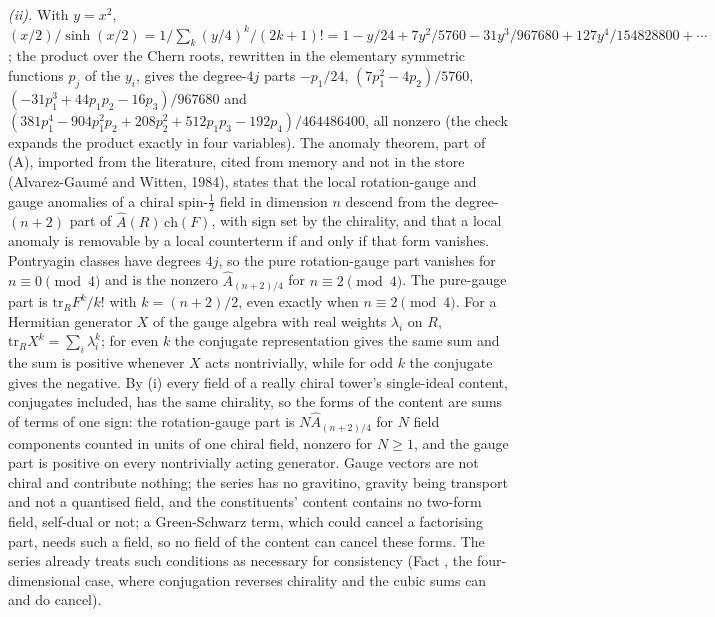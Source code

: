 \emph{(ii).} With $y = x^{2}$, $(x/2)/\sinh(x/2) = 1/\sum_{k} (y/4)^{k}/(2k+1)! = 1 - y/24 + 7y^{2}/5760 - 31y^{3}/967680 + 127y^{4}/154828800 + \cdots$; the product over the Chern roots, rewritten in the elementary symmetric functions $p_{j}$ of the $y_{i}$, gives the degree-$4j$ parts $-p_{1}/24$, $(7p_{1}^{2} - 4p_{2})/5760$, $(-31p_{1}^{3} + 44p_{1}p_{2} - 16p_{3})/967680$ and $(381p_{1}^{4} - 904p_{1}^{2}p_{2} + 208p_{2}^{2} + 512p_{1}p_{3} - 192p_{4})/464486400$, all nonzero (the check expands the product exactly in four variables). The anomaly theorem, part of (A), imported from the literature, cited from memory and not in the store (Alvarez-Gaum\'e and Witten, 1984), states that the local rotation-gauge and gauge anomalies of a chiral spin-$\tfrac12$ field in dimension $n$ descend from the degree-$(n+2)$ part of $\hat{A}(R)\,\mathrm{ch}(F)$, with sign set by the chirality, and that a local anomaly is removable by a local counterterm if and only if that form vanishes. Pontryagin classes have degrees $4j$, so the pure rotation-gauge part vanishes for $n \equiv 0 \pmod 4$ and is the nonzero $\hat{A}_{(n+2)/4}$ for $n \equiv 2 \pmod 4$. The pure-gauge part is $\mathrm{tr}_{R}F^{k}/k!$ with $k = (n+2)/2$, even exactly when $n \equiv 2 \pmod 4$. For a Hermitian generator $X$ of the gauge algebra with real weights $\lambda_{i}$ on $R$, $\mathrm{tr}_{R}X^{k} = \sum_{i}\lambda_{i}^{k}$; for even $k$ the conjugate representation gives the same sum and the sum is positive whenever $X$ acts nontrivially, while for odd $k$ the conjugate gives the negative. By (i) every field of a really chiral tower's single-ideal content, conjugates included, has the same chirality, so the forms of the content are sums of terms of one sign: the rotation-gauge part is $N\hat{A}_{(n+2)/4}$ for $N$ field components counted in units of one chiral field, nonzero for $N \ge 1$, and the gauge part is positive on every nontrivially acting generator. Gauge vectors are not chiral and contribute nothing; the series has no gravitino, gravity being transport and not a quantised field, and the constituents' content contains no two-form field, self-dual or not; a Green-Schwarz term, which could cancel a factorising part, needs such a field, so no field of the content can cancel these forms. The series already treats such conditions as necessary for consistency (Fact , the four-dimensional case, where conjugation reverses chirality and the cubic sums can and do cancel).

